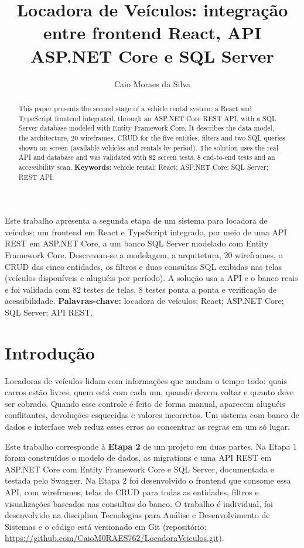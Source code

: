 \documentclass[12pt]{article}
\title{Locadora de Veículos: integração entre frontend React, API ASP.NET Core e SQL Server}
\author{Caio Moraes da Silva\inst{1}}
\begin{document}
\maketitle

\begin{abstract}
  This paper presents the second stage of a vehicle rental system: a React and TypeScript frontend integrated, through an ASP.NET Core REST API, with a SQL Server database modeled with Entity Framework Core. It describes the data model, the architecture, 20 wireframes, CRUD for the five entities, filters and two SQL queries shown on screen (available vehicles and rentals by period). The solution uses the real API and database and was validated with 82 screen tests, 8 end-to-end tests and an accessibility scan.
  \textbf{Keywords:} vehicle rental; React; ASP.NET Core; SQL Server; REST API.
\end{abstract}

\begin{resumo}
  Este trabalho apresenta a segunda etapa de um sistema para locadora de veículos: um frontend em React e TypeScript integrado, por meio de uma API REST em ASP.NET Core, a um banco SQL Server modelado com Entity Framework Core. Descrevem-se a modelagem, a arquitetura, 20 wireframes, o CRUD das cinco entidades, os filtros e duas consultas SQL exibidas nas telas (veículos disponíveis e aluguéis por período). A solução usa a API e o banco reais e foi validada com 82 testes de telas, 8 testes ponta a ponta e verificação de acessibilidade.
  \textbf{Palavras-chave:} locadora de veículos; React; ASP.NET Core; SQL Server; API REST.
\end{resumo}

\section{Introdução}

Locadoras de veículos lidam com informações que mudam o tempo todo: quais carros estão livres, quem está com cada um, quando devem voltar e quanto deve ser cobrado. Quando esse controle é feito de forma manual, aparecem aluguéis conflitantes, devoluções esquecidas e valores incorretos. Um sistema com banco de dados e interface web reduz esses erros ao concentrar as regras em um só lugar.

Este trabalho corresponde à \textbf{Etapa 2} de um projeto em duas partes. Na Etapa 1 foram construídos o modelo de dados, as migrations e uma API REST em ASP.NET Core com Entity Framework Core e SQL Server, documentada e testada pelo Swagger. Na Etapa 2 foi desenvolvido o frontend que consome essa API, com wireframes, telas de CRUD para todas as entidades, filtros e visualizações baseados nas consultas do banco. O trabalho é individual, foi desenvolvido na disciplina Tecnologias para Análise e Desenvolvimento de Sistemas e o código está versionado em Git (repositório: \url{https://github.com/CaioM0RAES762/LocadoraVeiculos.git}).
\end{document}
